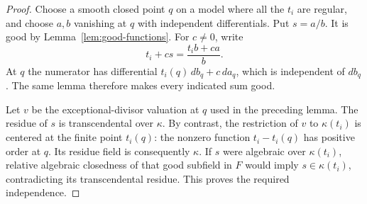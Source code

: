 \begin{proof}
Choose a smooth closed point $q$ on a model where all the $t_i$ are
regular, and choose $a,b$ vanishing at $q$ with independent differentials.
Put $s=a/b$.  It is good by Lemma~\ref{lem:good-functions}.  For
$c\ne0$, write
\[
                             t_i+cs=\frac{t_i b+ca}{b}.
\]
At $q$ the numerator has differential $t_i(q)\,db_q+c\,da_q$, which
is independent of $db_q$.  The same lemma therefore makes every indicated
sum good.

Let $v$ be the exceptional-divisor valuation at $q$ used in the preceding
lemma.  The residue of $s$ is transcendental over $\kappa$.  By contrast,
the restriction of $v$ to $\kappa(t_i)$ is centered at the finite point
$t_i(q)$: the nonzero function $t_i-t_i(q)$ has positive order at $q$.
Its residue field is consequently $\kappa$.  If $s$ were algebraic over
$\kappa(t_i)$, relative algebraic closedness of that good subfield in
$F$ would imply $s\in\kappa(t_i)$, contradicting its transcendental
residue.  This proves the required independence.
\end{proof}
